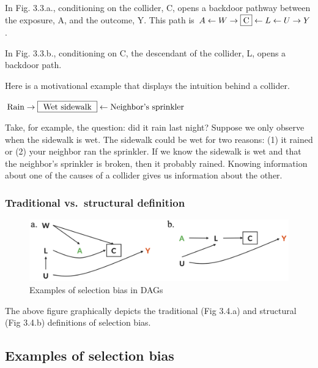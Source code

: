 \documentclass[
]{book}
\begin{document}
In Fig. 3.3.a., conditioning on the collider, C, opens a backdoor pathway between the exposure, A, and the outcome, Y. This path is \(A \leftarrow W \rightarrow \fbox{C} \leftarrow L \leftarrow U \rightarrow Y\).

In Fig. 3.3.b., conditioning on C, the descendant of the collider, L, opens a backdoor path.

Here is a motivational example that displays the intuition behind a collider.

\(\text{Rain} \rightarrow \fbox{ Wet sidewalk } \leftarrow \text{Neighbor's sprinkler}\)

Take, for example, the question: did it rain last night? Suppose we only observe when the sidewalk is wet. The sidewalk could be wet for two reasons: (1) it rained or (2) your neighbor ran the sprinkler. If we know the sidewalk is wet and that the neighbor's sprinkler is broken, then it probably rained. Knowing information about one of the causes of a collider gives us information about the other.

\hypertarget{traditional-vs.-structural-definition}{%
\subsubsection{Traditional vs.~structural definition}\label{traditional-vs.-structural-definition}}

\begin{figure}

{\centering \includegraphics[width=1\linewidth]{img/selection-bias/selection_bias_examples} 

}

\caption{Examples of selection bias in DAGs}\label{fig:unnamed-chunk-24}
\end{figure}

The above figure graphically depicts the traditional (Fig 3.4.a) and structural (Fig 3.4.b) definitions of selection bias.

\hypertarget{examples-of-selection-bias}{%
\subsection{Examples of selection bias}\label{examples-of-selection-bias}}
\end{document}

